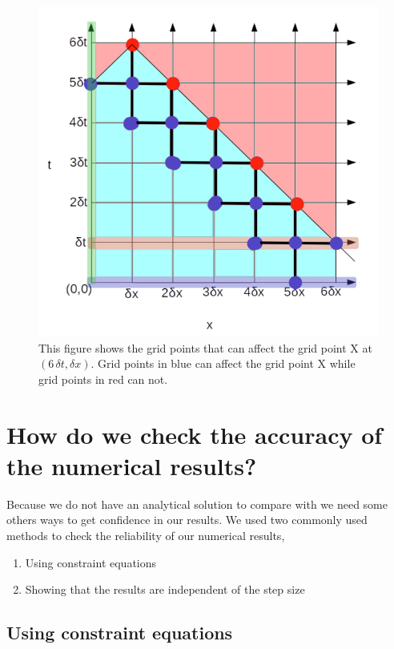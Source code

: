 \begin{figure}[hbt!]
    \centering
    \includegraphics[width=\textwidth]{images/grid_outer_boundary_condition.png}
    \caption{This figure shows the grid points that can affect the grid point X at $(6 \,\delta t, \delta x)$. Grid points in blue can affect the grid point X while grid points in red can not.}
    \label{fig:grid_outer_boundary_conditions}
\end{figure}


\section{How do we check the accuracy of the numerical results?}

Because we do not have an analytical solution to compare with we need some others ways to get confidence in our results. We used two commonly used methods to check the reliability of our numerical results,

\begin{enumerate}
    \item Using constraint equations
    \item Showing that the results are independent of the step size
\end{enumerate}

\subsection{Using constraint equations}

